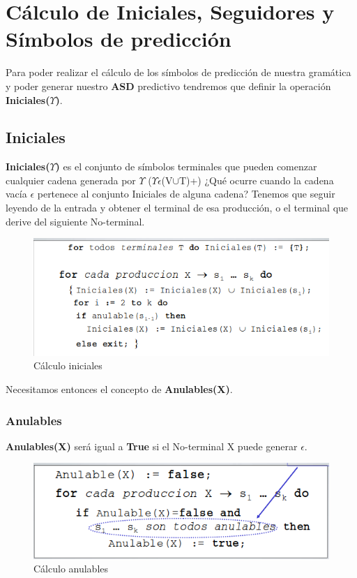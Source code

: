 \section{Cálculo de Iniciales, Seguidores y Símbolos de predicción}
Para poder realizar el cálculo de los símbolos de predicción de nuestra gramática y poder generar nuestro \textbf{ASD} predictivo tendremos que definir la operación \textbf{Iniciales($\Upsilon$)}.
\subsection{Iniciales}
\textbf{Iniciales($\Upsilon$)} es el conjunto de símbolos terminales que pueden comenzar cualquier cadena generada por $\Upsilon$ ($\Upsilon$$\epsilon$(V$\cup$T)+)
\newline
\newline
¿Qué ocurre cuando la cadena vacía $\epsilon$ pertenece al conjunto Iniciales de alguna cadena?
\newline
Tenemos que seguir leyendo de la entrada y obtener el terminal de esa producción, o el terminal que derive del siguiente No-terminal. \cite{PL2}
\newline
\newline
\begin{figure}[h]
	\centering
	\includegraphics[width=0.7\linewidth]{img/ini}
	\caption{Cálculo iniciales}
	\label{fig:ini}
\end{figure}

Necesitamos entonces el concepto de \textbf{Anulables(X)}.
\subsubsection{Anulables}
\textbf{Anulables(X)} será igual a \textbf{True} si el No-terminal X puede generar $\epsilon$.
\begin{figure}[h]
	\centering
	\includegraphics[width=0.7\linewidth]{img/an}
	\caption{Cálculo anulables}
	\label{fig:an}
\end{figure}
\clearpage
